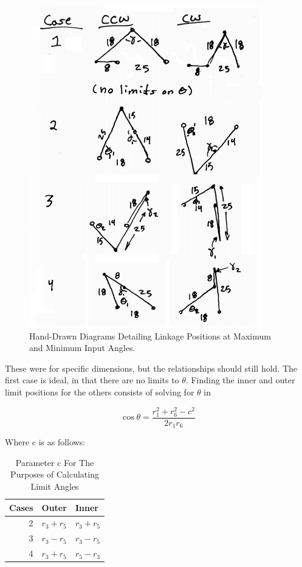 \documentclass[12pt, letterpaper]{article}
\begin{document}
\begin{figure}[H]
\centering
\caption{Hand-Drawn Diagrams Detailing Linkage Positions at Maximum and Minimum Input Angles.}
\label{fig:limits}
\includegraphics[width=4.0in]{position_diagrams}
\end{figure}

These were for specific dimensions, but the relationships should still hold. The first case is ideal, in that there are no limits to \(\theta\). Finding the inner and outer limit positions for the others consists of solving for \(\theta\) in

\[\cos\theta=\frac{r_1^2+r_6^2-c^2}{2r_1r_6}\]

Where c is as follows:

\begin{table}[H]
  \centering
  \caption{Parameter c For The Purposes of Calculating Limit Angles}
  \begin{tabular}{r*{2}{l}} 
    Cases & Outer & Inner \\\hline
    2 & \(r_3+r_5\) & \(r_3+r_5\)\\
    3 & \(r_3-r_5\) & \(r_3-r_5\)\\
    4 & \(r_3+r_5\) & \(r_5-r_3\)
  \end{tabular}
  \label{tab:limit_param}
\end{table}
\end{document}
